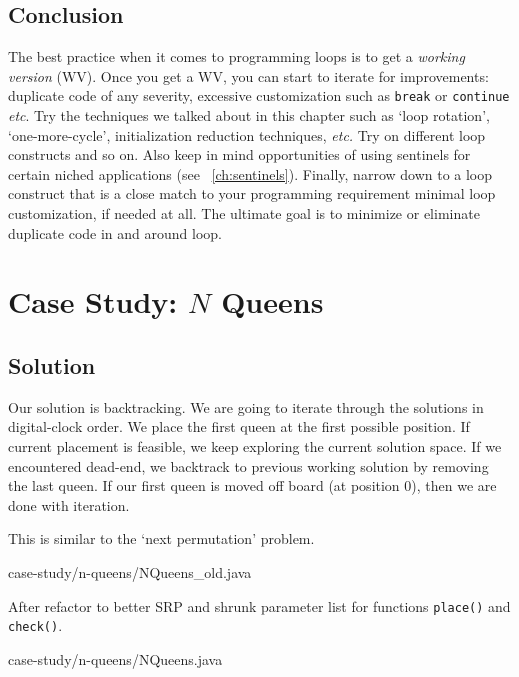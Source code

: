 \documentclass[oneside,11pt]{book}
\theoremstyle{definition}
\theoremstyle{remark}
\newcommand{\code}[1]{\mbox{\lstinline{#1}}}
\begin{document}
\section{Conclusion}

The best practice when it comes to programming loops is to get a \emph{working version} (WV).
Once you get a WV, you can start to iterate for improvements:
duplicate code of any severity, excessive customization such as \code{break} or \code{continue}
\textit{etc}.
Try the techniques we talked about in this chapter such as `loop rotation',
`one-more-cycle', initialization reduction techniques, \textit{etc.}
Try on different loop constructs and so on.
Also keep in mind opportunities of using sentinels for certain niched applications (see
~\autoref{ch:sentinels}).
Finally, narrow down to a loop construct
that is a close match to your programming requirement
minimal loop customization, if needed at all.
The ultimate goal is to minimize or eliminate duplicate code in and around loop.

\clearpage{}
    \clearpage{}

\chapter{Case Study: $N$ Queens}\label{ch:n-queens}





\section{Solution}
Our solution is backtracking.
We are going to iterate through the solutions in digital-clock order.
We place the first queen at the first possible position.
If current placement is feasible, we keep exploring the current solution space.
If we encountered dead-end, we backtrack to previous working solution by removing the last queen.
If our first queen is moved off board (at position 0), then we are done with iteration.

This is similar to the `next permutation' problem.



{case-study/n-queens/NQueens_old.java}

After refactor to better SRP and shrunk parameter list for functions \code{place()} and
\code{check()}.


{case-study/n-queens/NQueens.java}
\end{document}
